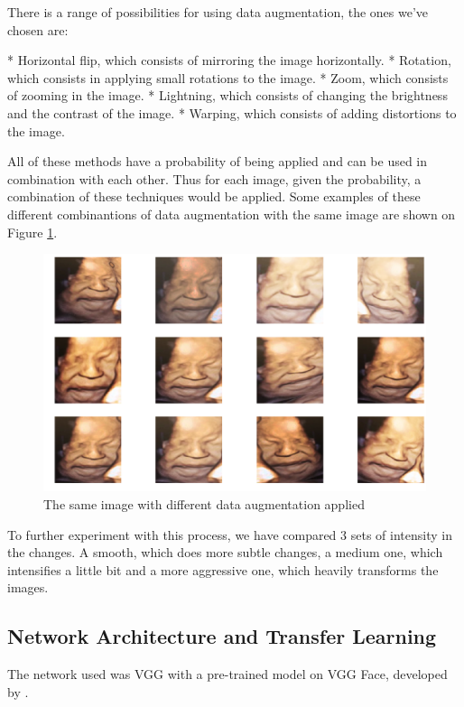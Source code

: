 There is a range of possibilities for using data augmentation, the ones we've chosen are:

* Horizontal flip, which consists of mirroring the image horizontally. 
* Rotation, which consists in applying small rotations to the image.
* Zoom, which consists of zooming in the image.
* Lightning, which consists of changing the brightness and the contrast of the image.
* Warping, which consists of adding distortions to the image. 

All of these methods have a probability of being applied and can be used in combination with each other. Thus for each image, given the probability, a combination of these techniques would be applied. Some examples of these different combinantions of data augmentation with the same image are shown on Figure \ref{fig:data_augmentation}.

\begin{figure}[h!tp]
    \centering
    \includegraphics[width=.9\textwidth]{imgs/chap3_data_augmentation.png}
    \caption{The same image with different data augmentation applied}
    \label{fig:data_augmentation}
\end{figure}

To further experiment with this process, we have compared 3 sets of intensity in the changes. A smooth, which does more subtle changes, a medium one, which intensifies a little bit and a more aggressive one, which heavily transforms the images.  

\subsection{Network Architecture and Transfer Learning}

The network used was VGG with a pre-trained model on VGG Face, developed by \cite{ParkhiVZ15}.



